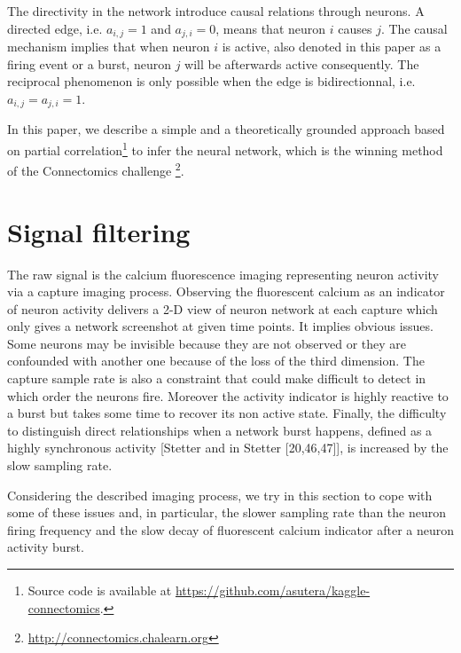 \documentclass[wcp]{jmlr}
\begin{document}
The directivity in the network introduce causal relations through neurons. A directed edge, i.e. $a_{i,j} = 1$ and $a_{j,i} = 0$, means that neuron $i$ causes $j$. The causal mechanism implies that when neuron $i$ is active, also denoted in this paper as a firing event or a burst, neuron $j$ will be afterwards active consequently. The reciprocal phenomenon is only possible when the edge is bidirectionnal, i.e. $a_{i,j} = a_{j,i} = 1$.

In this paper, we describe a simple and a theoretically grounded approach
based on partial correlation\footnote{Source code is available at
\url{https://github.com/asutera/kaggle-connectomics}.} to infer the neural
network, which is the winning method of the Connectomics challenge
\footnote{\url{http://connectomics.chalearn.org}}.


\section{Signal filtering} \label{sec:filter}




The raw signal is the calcium fluorescence imaging representing neuron
activity via a capture imaging process. Observing the fluorescent calcium as
an indicator of neuron activity delivers a 2-D view of neuron network at each
capture which only gives a network screenshot at given time points. It implies
obvious issues. Some neurons may be invisible because they are not observed or
they are confounded with another one because of the loss of the third
dimension. The capture sample rate is also a constraint that could make
difficult to detect in which order the neurons fire.  Moreover the activity
indicator is highly reactive to a burst but takes some time to recover its non
active state.  Finally, the difficulty to distinguish direct relationships when a network burst happens, defined as a highly synchronous activity [Stetter and in Stetter [20,46,47]], is increased by the slow sampling rate.

Considering the described imaging process, we try in this
section to cope with some of these issues and, in particular, the slower
sampling rate than the neuron firing frequency and the slow decay of
fluorescent calcium indicator after a neuron activity burst.
\end{document}
